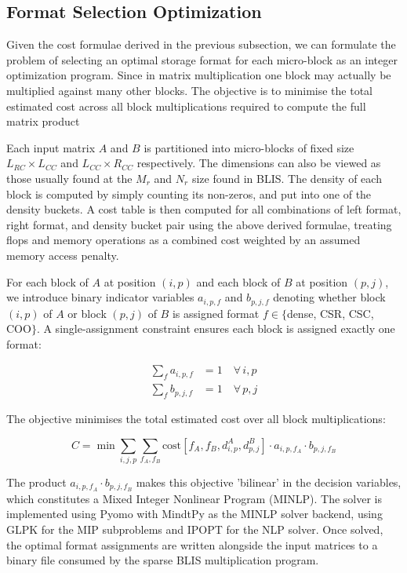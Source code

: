 \subsection{Format Selection Optimization}

Given the cost formulae derived in the previous subsection, we can formulate the problem of
selecting an optimal storage format for each micro-block as an integer optimization program.
Since in matrix multiplication one block may actually be multiplied against many other blocks.
The objective is to minimise the total estimated cost across all block multiplications
required to compute the full matrix product

Each input matrix $A$ and $B$ is partitioned into micro-blocks of fixed size
$L_{RC} \times L_{CC}$ and $L_{CC} \times R_{CC}$ respectively. The dimensions can also be viewed as those usually found at the $M_r$ and $N_r$ size found in BLIS. The density of each
block is computed by simply counting its non-zeros, and put into one of
the density buckets. A cost table is then computed for all combinations of left format,
right format, and density bucket pair using the above derived formulae, treating flops and
memory operations as a combined cost weighted by an assumed memory access penalty.

For each block of $A$ at position $(i, p)$ and each block of $B$ at position $(p, j)$,
we introduce binary indicator variables $a_{i,p,f}$ and $b_{p,j,f}$ denoting whether
block $(i,p)$ of $A$ or block $(p,j)$ of $B$ is assigned format $f \in \{$dense, CSR,
CSC, COO$\}$. A single-assignment constraint ensures each block is assigned exactly one
format:

\begin{align}
\sum_{f} a_{i,p,f} &= 1 \quad \forall\, i, p \\
\sum_{f} b_{p,j,f} &= 1 \quad \forall\, p, j
\end{align}

The objective minimises the total estimated cost over all block multiplications:

\begin{equation}
C = \min \sum_{i,j,p} \sum_{f_A, f_B}
    \text{cost}[f_A, f_B, d^A_{i,p}, d^B_{p,j}]
    \cdot a_{i,p,f_A} \cdot b_{p,j,f_B}
\end{equation}

The product $a_{i,p,f_A} \cdot b_{p,j,f_B}$ makes this objective 'bilinear' in the
decision variables, which constitutes a Mixed Integer Nonlinear
Program (MINLP). The solver is implemented using Pyomo \cite{pyomo} with MindtPy
\cite{mindtpy} as the MINLP solver backend, using GLPK \cite{glpk} for the MIP subproblems and
IPOPT \cite{ipopt} for the NLP solver. Once solved, the optimal format
assignments are written alongside the
input matrices to a binary file consumed by the sparse BLIS multiplication program.


